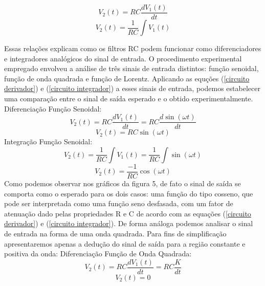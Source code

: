 \documentclass[a4paper]{article}
\begin{document}
\begin{equation} \label{circuito derivador}
V_{2}(t)=RC\frac{dV_{1}(t)}{dt} 
\end{equation}
\begin{equation} \label{circuito integrador}
V_{2}(t)=\frac{1}{RC}\int V_{1}(t)
\end{equation}

Essas relações explicam como os filtros RC podem funcionar como diferenciadores e integradores analógicos do sinal de entrada. O procedimento experimental empregado envolveu a análise de três sinais de entrada distintos: função senoidal, função de onda quadrada e função de Lorentz. Aplicando as equções (\ref{circuito derivador}) e (\ref{circuito integrador}) a esses sinais de entrada, podemos estabelecer uma comparação entre o sinal de saída esperado e o obtido experimentalmente. 
\newline
\newline
Diferenciação Função Senoidal:
\begin{equation*} 
V_{2}(t)=RC\frac{dV_{1}(t)}{dt}=RC\frac{d\sin(\omega t)}{dt} 
\end{equation*}
\begin{equation} 
V_{2}(t)=RC\sin(\omega t)
\end{equation}
Integração Função Senoidal:
\begin{equation*} 
V_{2}(t)=\frac{1}{RC}\int V_{1}(t)=\frac{1}{RC}\int \sin(\omega t)
\end{equation*}
\begin{equation*} 
V_{2}(t)=\frac{-1}{RC}\cos(\omega t)
\end{equation*}
Como podemos observar nos gráficos da figura 5, de fato o sinal de saída se comporta como o esperado para os dois casos: uma função do tipo cosseno, que pode ser interpretada como uma função seno desfasada, com um fator de atenuação dado pelas propriedades R e C de acordo com as equações (\ref{circuito derivador}) e (\ref{circuito integrador}). 
De forma análoga podemos analisar o sinal de entrada na forma de uma onda quadrada. Para fins de simplificação apresentaremos apenas a dedução do sinal de saída para a região constante e positiva da onda:
\newline
\newline
Diferenciação Função de Onda Quadrada:
\begin{equation*} 
V_{2}(t)=RC\frac{dV_{1}(t)}{dt}=RC\frac{K}{dt} 
\end{equation*}
\begin{equation} 
V_{2}(t)=0
\end{equation}
\end{document}

